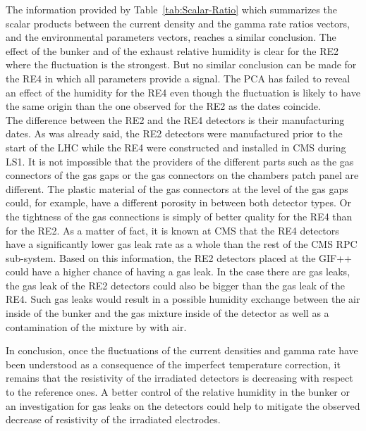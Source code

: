 	The information provided by Table~\ref{tab:Scalar-Ratio} which summarizes the scalar products between the current density and the gamma rate ratios vectors, and the environmental parameters vectors, reaches a similar conclusion. The effect of the bunker and of the exhaust relative humidity is clear for the RE2 where the fluctuation is the strongest. But no similar conclusion can be made for the RE4 in which all parameters provide a signal. The PCA has failed to reveal an effect of the humidity for the RE4 even though the fluctuation is likely to have the same origin than the one observed for the RE2 as the dates coincide.\\
	The difference between the RE2 and the RE4 detectors is their manufacturing dates. As was already said, the RE2 detectors were manufactured prior to the start of the LHC while the RE4 were constructed and installed in CMS during LS1. It is not impossible that the providers of the different parts such as the gas connectors of the gas gaps or the gas connectors on the chambers patch panel are different. The plastic material of the gas connectors at the level of the gas gaps could, for example, have a different porosity in between both detector types. Or the tightness of the gas connections is simply of better quality for the RE4 than for the RE2. As a matter of fact, it is known at CMS that the RE4 detectors have a significantly lower gas leak rate as a whole than the rest of the CMS RPC sub-system. Based on this information, the RE2 detectors placed at the GIF++ could have a higher chance of having a gas leak. In the case there are gas leaks, the gas leak of the RE2 detectors could also be bigger than the gas leak of the RE4. Such gas leaks would result in a possible humidity exchange between the air inside of the bunker and the gas mixture inside of the detector as well as a contamination of the mixture by with air.

\endgroup
	
	In conclusion, once the fluctuations of the current densities and gamma rate have been understood as a consequence of the imperfect temperature correction, it remains that the resistivity of the irradiated detectors is decreasing with respect to the reference ones. A better control of the relative humidity in the bunker or an investigation for gas leaks on the detectors could help to mitigate the observed decrease of resistivity of the irradiated electrodes.
	
\newpage
	
